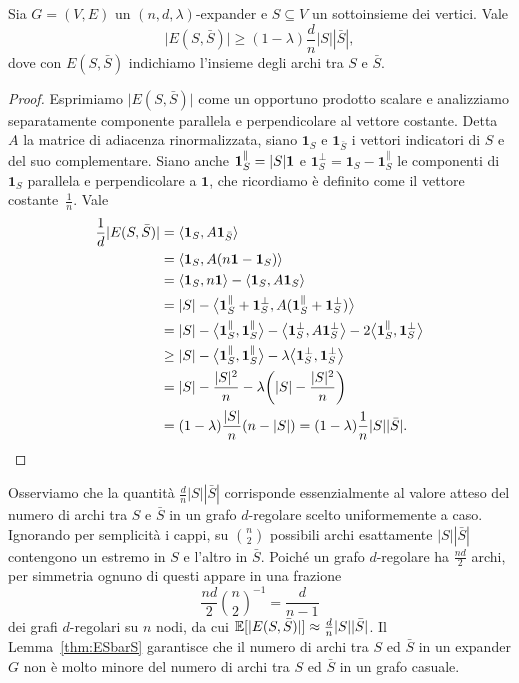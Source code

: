 \begin{lemma} \label{thm:ESbarS}
	Sia $G = (V, E)$ un $(n, d, \lambda)$-expander e $S \subseteq V$ un
	sottoinsieme dei vertici. Vale
	\[
		\lvert E(S, \bar{S}) \rvert \ge (1 - \lambda)\frac{d}{n}|S||\bar{S}|,
	\]
	dove con $E(S, \bar S)$ indichiamo l'insieme degli archi tra $S$ e $\bar S$.
\end{lemma}
\begin{proof}
	Esprimiamo $\lvert E(S, \bar S) \rvert$ come un opportuno prodotto scalare e
	analizziamo separatamente componente parallela e perpendicolare al vettore
	costante.
	Detta $A$ la matrice di adiacenza rinormalizzata, siano $\bm{1}_S$ e
	$\bm{1}_{\bar{S}}$ i vettori indicatori di $S$ e del suo complementare.
	Siano anche $\bm{1}_S^\parallel = |S| \bm{1}$ e
	$\bm{1}_S^\perp = \bm{1}_S - \bm{1}_S^\parallel$ le componenti
	di $\bm{1}_S$ parallela e perpendicolare a $\bm{1}$, che ricordiamo è
	definito come il vettore costante~$\frac1{n}$.
	Vale
	\begin{align*}
		\frac{1}{d} \lvert E(S, \bar S) \rvert
			&= \langle \bm{1}_S, A \bm{1}_{\bar S} \rangle \\
		&= \langle \bm{1}_S, A (n \bm{1} - \bm{1}_S) \rangle \\
		&= \langle \bm{1}_S, n \bm{1} \rangle
			- \langle \bm{1}_S, A \bm{1}_S \rangle \\
		&= |S| - \bigl\langle \bm{1}_S^\parallel + \bm{1}_S^\perp,
			A (\bm{1}_S^\parallel + \bm{1}_S^\perp ) \bigr\rangle \\
		&= |S| - \bigl\langle \bm{1}_S^\parallel, \bm{1}_S^\parallel \bigr\rangle
			- \bigl\langle \bm{1}_S^\perp, A \bm{1}_S^\perp \bigr\rangle
			- 2 \bigl\langle \bm{1}_S^\parallel, \bm{1}_S^\perp \bigr\rangle \\
		&\ge |S| - \bigl\langle \bm{1}_S^\parallel, \bm{1}_S^\parallel \bigr\rangle
			- \lambda \bigl\langle \bm{1}_S^\perp, \bm{1}_S^\perp \bigr\rangle \\
		&= |S| - \frac{|S|^2}{n} - \lambda\biggl(|S| - \frac{|S|^2}{n}\biggr) \\
		&= (1 - \lambda)\frac{|S|}{n}(n - |S|) = (1 - \lambda) \frac1{n} |S| |\bar S|.
	\end{align*}
\end{proof}

Osserviamo che la quantità $\frac{d}{n}|S| |\bar S|$ corrisponde essenzialmente
al valore atteso del numero di archi tra $S$ e $\bar S$ in un grafo
$d$-regolare scelto uniformemente a caso.
Ignorando per semplicità i cappi, su $\binom{n}{2}$ possibili archi esattamente
$|S| |\bar S|$ contengono un estremo in $S$ e l'altro in $\bar S$.
Poiché un grafo $d$-regolare ha $\frac{n d}{2}$ archi, per simmetria ognuno di
questi appare in una frazione
\[
	\frac{n d}{2} {\binom{n}{2}}^{-1} = \frac{d}{n - 1}
\]
dei grafi $d$-regolari su $n$ nodi, da cui $\mathbb{E}[\lvert E(S, \bar S) \rvert]
\approx \frac{d}{n} |S| |\bar S|$.
Il Lemma~\ref{thm:ESbarS} garantisce che il numero di archi tra $S$ ed $\bar S$
in un expander $G$ non è molto minore del numero di archi tra $S$ ed $\bar S$
in un grafo casuale.

